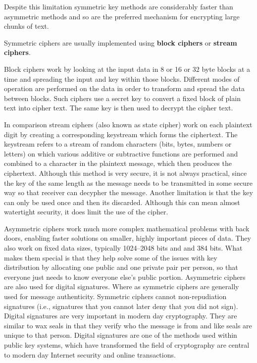 Despite this limitation symmetric key methods are considerably faster
than asymmetric methods and so are the preferred mechanism for
encrypting large chunks of text.

Symmetric ciphers are usually implemented using \textbf{block ciphers}
or \textbf{stream ciphers}.

Block ciphers work by looking at the input data in 8 or 16 or 32 byte
blocks at a time and spreading the input and key within those blocks.
Different modes of operation are performed on the data in order to
transform and spread the data between blocks. Such ciphers use a secret
key to convert a fixed block of plain text into cipher text. The same
key is then used to decrypt the cipher text.

In comparison stream ciphers (also known as state cipher) work on each
plaintext digit by creating a corresponding keystream which forms the
ciphertext. The keystream refers to a stream of random characters (bits,
bytes, numbers or letters) on which various additive or subtractive
functions are performed and combined to a character in the plaintext
message, which then produces the ciphertext. Although this method is
very secure, it is not always practical, since the key of the same
length as the message needs to be transmitted in some secure way so that
receiver can decypher the message. Another limitation is that the key
can only be used once and then its discarded. Although this can mean
almost watertight security, it does limit the use of the cipher.

Asymmetric ciphers work much more complex mathematical problems with
back doors, enabling faster solutions on smaller, highly important
pieces of data. They also work on fixed data sizes, typically 1024--2048
bits and and 384 bits. What makes them special is that they help solve
some of the issues with key distribution by allocating one public and
one private pair per person, so that everyone just needs to know
everyone else's public portion. Asymmetric ciphers are also used for
digital signatures. Where as symmetric ciphers are generally used for
message authenticity. Symmetric ciphers cannot non-repudiation
signatures (i.e., signatures that you cannot later deny that you did not
sign). Digital signatures are very important in modern day cryptography.
They are similar to wax seals in that they verify who the message is
from and like seals are unique to that person. Digital signatures are
one of the methods used within public key systems, which have
transformed the field of cryptography are central to modern day Internet
security and online transactions.

